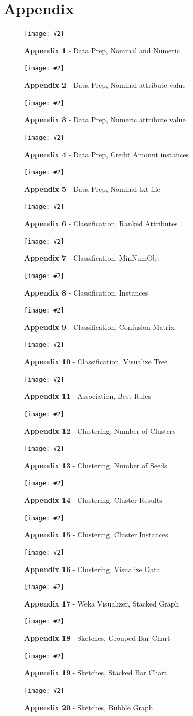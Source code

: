 \documentclass[12pt, a4paper]{article}
\newcommand{\figuremacro}[5]{
    \begin{figure}[#1]
        \centering
        \texttt{[image: \#2]}
        \caption[#3]{\textbf{#3}#4}
        \label{fig:#2}
    \end{figure}
}
\begin{document}
	\section{Appendix}
	\figuremacro{h}{appendix1}{Appendix 1}{ - Data Prep, Nominal and Numeric}{2.0}
	\figuremacro{h}{appendix2}{Appendix 2}{ - Data Prep, Nominal attribute value}{1.0}
	\figuremacro{h}{appendix3}{Appendix 3}{ - Data Prep, Numeric attribute value}{1.0}
	\figuremacro{h}{appendix4}{Appendix 4}{ - Data Prep, Credit Amount instances}{1.0}
	\figuremacro{h}{appendix5}{Appendix 5}{ - Data Prep, Nominal txt file}{2.0}
	\figuremacro{h}{appendix6}{Appendix 6}{ - Classification, Ranked Attributes}{1.0}
	\figuremacro{h}{appendix7}{Appendix 7}{ - Classification, MinNumObj}{1.0}
	\figuremacro{h}{appendix8}{Appendix 8}{ - Classification, Instances}{1.0}
	\figuremacro{h}{appendix9}{Appendix 9}{ - Classification, Confusion Matrix}{1.0}
	\figuremacro{h}{appendix10}{Appendix 10}{ - Classification, Visualize Tree}{2.0}
	\figuremacro{h}{appendix11}{Appendix 11}{ - Association, Best Rules}{2.0}
	\figuremacro{h}{appendix12}{Appendix 12}{ - Clustering, Number of Clusters}{1.0}
	\figuremacro{h}{appendix13}{Appendix 13}{ - Clustering, Number of Seeds}{1.0}
	\figuremacro{h}{appendix14}{Appendix 14}{ - Clustering, Cluster Results}{1.0}
	\figuremacro{h}{appendix15}{Appendix 15}{ - Clustering, Cluster Instances}{1.0}
	\figuremacro{h}{appendix16}{Appendix 16}{ - Clustering, Visualize Data}{1.0}
	\figuremacro{h}{appendix17}{Appendix 17}{ - Weka Visualizer, Stacked Graph}{1.0}
	\figuremacro{h}{appendix18}{Appendix 18}{ - Sketches, Grouped Bar Chart}{1.0}
	\figuremacro{h}{appendix19}{Appendix 19}{ - Sketches, Stacked Bar Chart}{1.0}
	\figuremacro{h}{appendix20}{Appendix 20}{ - Sketches, Bubble Graph}{1.0}
	
	
	


		
\end{document}
